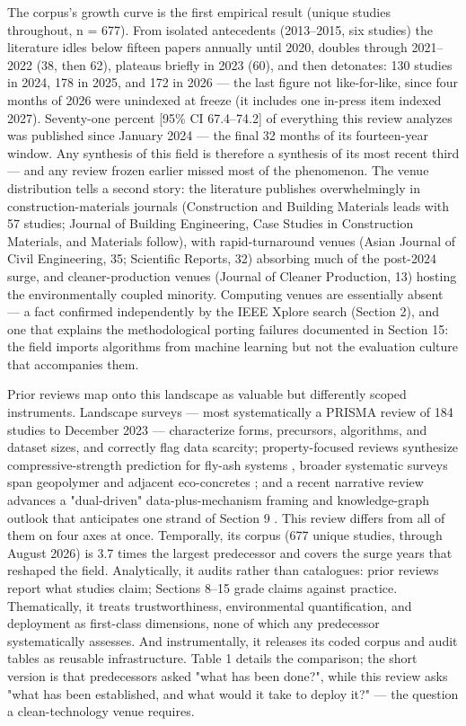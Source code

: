 \documentclass[pdflatex,sn-basic]{sn-jnl}
\begin{document}
The corpus's growth curve is the first empirical result (unique studies throughout, n = 677). From isolated antecedents (2013--2015, six studies) the literature idles below fifteen papers annually until 2020, doubles through 2021--2022 (38, then 62), plateaus briefly in 2023 (60), and then detonates: 130 studies in 2024, 178 in 2025, and 172 in 2026 --- the last figure not like-for-like, since four months of 2026 were unindexed at freeze (it includes one in-press item indexed 2027). Seventy-one percent [95\% CI 67.4--74.2] of everything this review analyzes was published since January 2024 --- the final 32 months of its fourteen-year window. Any synthesis of this field is therefore a synthesis of its most recent third --- and any review frozen earlier missed most of the phenomenon. The venue distribution tells a second story: the literature publishes overwhelmingly in construction-materials journals (Construction and Building Materials leads with 57 studies; Journal of Building Engineering, Case Studies in Construction Materials, and Materials follow), with rapid-turnaround venues (Asian Journal of Civil Engineering, 35; Scientific Reports, 32) absorbing much of the post-2024 surge, and cleaner-production venues (Journal of Cleaner Production, 13) hosting the environmentally coupled minority. Computing venues are essentially absent --- a fact confirmed independently by the IEEE Xplore search (Section 2), and one that explains the methodological porting failures documented in Section 15: the field imports algorithms from machine learning but not the evaluation culture that accompanies them.

Prior reviews map onto this landscape as valuable but differently scoped instruments. Landscape surveys --- most systematically a PRISMA review of 184 studies to December 2023 \citep{nguyen2025} --- characterize forms, precursors, algorithms, and dataset sizes, and correctly flag data scarcity; property-focused reviews synthesize compressive-strength prediction for fly-ash systems \citep{rathnayaka2024}, broader systematic surveys span geopolymer and adjacent eco-concretes \citep{ali2024,alaneme2023}; and a recent narrative review advances a "dual-driven" data-plus-mechanism framing and knowledge-graph outlook that anticipates one strand of Section 9 \citep{zheng2025}. This review differs from all of them on four axes at once. Temporally, its corpus (677 unique studies, through August 2026) is 3.7 times the largest predecessor and covers the surge years that reshaped the field. Analytically, it audits rather than catalogues: prior reviews report what studies claim; Sections 8--15 grade claims against practice. Thematically, it treats trustworthiness, environmental quantification, and deployment as first-class dimensions, none of which any predecessor systematically assesses. And instrumentally, it releases its coded corpus and audit tables as reusable infrastructure. Table 1 details the comparison; the short version is that predecessors asked "what has been done?", while this review asks "what has been established, and what would it take to deploy it?" --- the question a clean-technology venue requires.
\end{document}
